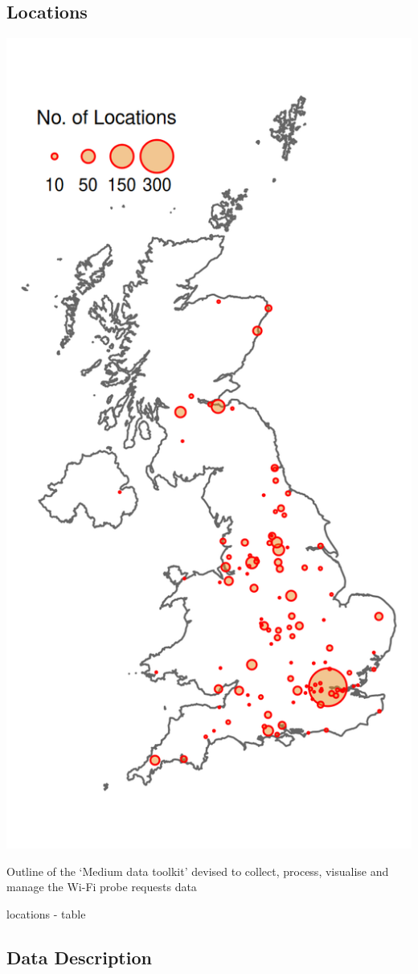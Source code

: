 \subsection{Locations}
\begin{marginfigure}[8cm]
  \includegraphics[trim = {0 20 0 0}, clip]{images/sss-locations.png}
  \caption{Outline of the `Medium data toolkit' devised to collect, process, visualise and manage the Wi-Fi probe requests data}
  \label{figure:literature:tech:timeline}
\end{marginfigure}

\lipsum[1]
locations - table

\subsection{Data Description}


\lipsum[1-3]
